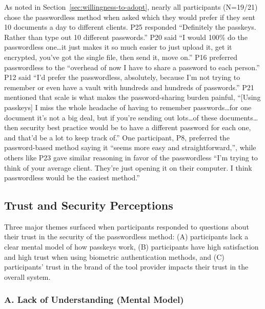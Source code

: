As noted in Section~\ref{sec:willingness-to-adopt}, nearly all participants (N=19/21) chose the passwordless method when asked which they would prefer if they sent 10 documents a day to different clients. P25 responded ``Definitely the passkeys. Rather than type out 10 different passwords.'' P20 said ``I would 100\% do the passwordless one\ldots it just makes it so much easier to just upload it, get it encrypted, you've got the single file, then send it, move on.'' P16 preferred passwordless to the ``overhead of now I have to share a password to each person.'' P12 said ``I'd prefer the passwordless, absolutely, because I'm not trying to remember or even have a vault with hundreds and hundreds of passwords.'' P21 mentioned that scale is what makes the password-sharing burden painful, ``[Using passkeys] I miss the whole headache of having to remember passwords\ldots for one document it's not a big deal, but if you're sending out lots\ldots of these documents\ldots then security best practice would be to have a different password for each one, and that'd be a lot to keep track of.'' One participant, P8, preferred the password-based method saying it ``seems more easy and straightforward,'', while others like P23 gave similar reasoning in favor of the passwordless ``I'm trying to think of your average client. They're just opening it on their computer. I think passwordless would be the easiest method.''

\subsection{Trust and Security Perceptions}
\label{sec:trust-security}

Three major themes surfaced when participants responded to questions about their trust in the security of the passwordless method: (A) participants lack a clear mental model of how passkeys work, (B) participants have high satisfaction and high trust when using biometric authentication methods, and (C) participants' trust in the brand of the tool provider impacts their trust in the overall system.

\subsubsection*{A. Lack of Understanding (Mental Model)}

